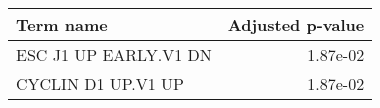 \begin{tabular}{lr}
\toprule
            Term name &  Adjusted p-value \\
\midrule
ESC J1 UP EARLY.V1 DN &          1.87e-02 \\
   CYCLIN D1 UP.V1 UP &          1.87e-02 \\
\bottomrule
\end{tabular}
